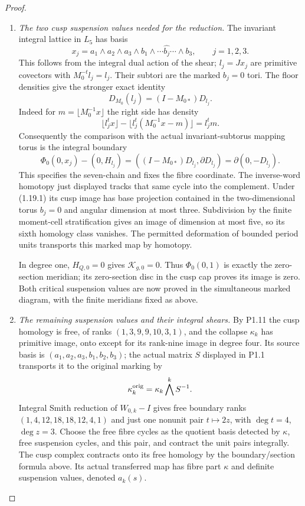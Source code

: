 \begin{proof}
\begin{enumerate}[label=\arabic*.]
The numerical top-coordinate relation is
\[
 h_0=-h_1W_{2,5}W_{0,5}-h_2W_{0,5}=(-1,1,1,-3,-1,0),
 \quad U_{0,6}(f,x)=(f+h_0x,x),
\]
with identity in other degrees, and
\[
 \Phi_0=\Phi_0^QU_0,\qquad S_Yj_Y=j_YU_0.
\]
In particular $j_Y$ is transported explicitly. On the actual three
invariant five-vector columns $X$, $h_0X=(0,-2,-2)$; this nonzero
coordinate is retained by these maps.

\item \emph{The two cusp suspension values needed for the reduction.}
The invariant integral lattice in $L_5$ has basis
\[
 x_j=a_1\wedge a_2\wedge a_3\wedge
 b_1\wedge\cdots\widehat{b_j}\cdots\wedge b_3,
 \qquad j=1,2,3.
\]
This follows from the integral dual action of the shear;
$l_j=Jx_j$ are primitive covectors with $M_0^{-t}l_j=l_j$.
Their subtori are the marked $b_j=0$ tori. The floor densities give
the stronger exact identity
\[
 D_{M_0}(l_j)=(I-M_{0*})D_{l_j}.
\]
Indeed for $m=\lfloor M_0^{-1}x\rfloor$ the right side has density
\[
 \lfloor l_j^tx\rfloor-
 \lfloor l_j^t(M_0^{-1}x-m)\rfloor=l_j^tm.
\]
Consequently the comparison with the actual invariant-subtorus
mapping torus is the integral boundary
\[
 \Phi_0(0,x_j)-(0,H_{l_j})
 =((I-M_{0*})D_{l_j},\partial D_{l_j})
 =\partial(0,-D_{l_j}).
\]
This specifies the seven-chain and fixes the fibre coordinate.
The inverse-word homotopy just displayed tracks that same cycle
into the complement. Under (1.19.1) its cusp image has base
projection contained in the two-dimensional torus $b_j=0$ and
angular dimension at most three. Subdivision by the finite
moment-cell stratification gives an image of dimension at most five,
so its sixth homology class vanishes. The permitted deformation of
bounded period units transports this marked map by homotopy.

In degree one, $H_{Q,0}=0$ gives $\mathcal K_{g,0}=0$.
Thus $\Phi_0(0,1)$ is exactly the zero-section meridian; its
zero-section disc in the cusp cap proves its image is zero.
Both critical suspension values are now proved in the simultaneous
marked diagram, with the finite meridians fixed as above.

\item \emph{The remaining suspension values and their integral shears.}
By P1.11 the cusp homology is free, of ranks
$(1,3,9,9,10,3,1)$, and the collapse $\kappa_k$ has primitive
image, onto except for its rank-nine image in degree four.
Its source basis is $(a_1,a_2,a_3,b_1,b_2,b_3)$; the actual matrix
$S$ displayed in P1.1 transports it to the original marking by
\[
 \kappa_k^{\rm orig}=\kappa_k\bigwedge^kS^{-1}.
\]
Integral Smith reduction of $W_{0,k}-I$ gives free boundary ranks
$(1,4,12,18,18,12,4,1)$ and just one nonunit pair
$t\mapsto2z$, with $\deg t=4$, $\deg z=3$.
Choose the free fibre cycles as the quotient basis detected by
$\kappa$, free suspension cycles, and this pair, and contract
the unit pairs integrally. The cusp complex contracts onto its free
homology by the boundary/section formula above. Its actual
transferred map has fibre part $\kappa$ and definite suspension
values, denoted $a_k(s)$.


\end{enumerate}
\end{proof}
